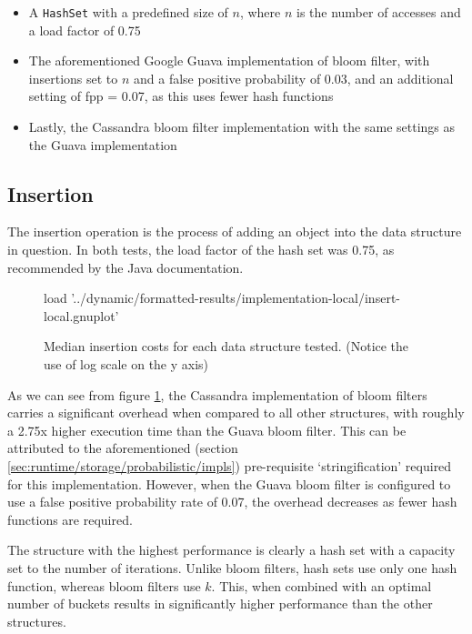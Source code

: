 \begin{itemize}
	\item A \texttt{HashSet} with a predefined size of $n$, where $n$ is the number of accesses and a load factor of 0.75
	\item The aforementioned Google Guava implementation of bloom filter, with insertions set to $n$ and a false positive probability of 0.03, and an additional setting of fpp = 0.07, as this uses fewer hash functions
	\item Lastly, the Cassandra bloom filter implementation with the same settings as the Guava implementation
\end{itemize}

	\subsection{Insertion} \label{sec:results/bfimpl/insert}
	The insertion operation is the process of adding an object into the data structure in question. In both tests, the load factor of the hash set was 0.75, as recommended by the Java documentation.
	
	\begin{figure}
		\centering
		\begin{gnuplot}[terminal=pdf]
			load '../dynamic/formatted-results/implementation-local/insert-local.gnuplot'
		\end{gnuplot}
		\caption{Median insertion costs for each data structure tested. (Notice the use of log scale on the y axis)}
		\label{chart:impl-insert}
	\end{figure}
	
	As we can see from figure \ref{chart:impl-insert}, the Cassandra implementation of bloom filters carries a significant overhead when compared to all other structures, with roughly a 2.75x higher execution time than the Guava bloom filter. This can be attributed to the aforementioned (section \ref{sec:runtime/storage/probabilistic/impls}) pre-requisite `stringification' required for this implementation. However, when the Guava bloom filter is configured to use a false positive probability rate of 0.07, the overhead decreases as fewer hash functions are required.
	
	The structure with the highest performance is clearly a hash set with a capacity set to the number of iterations. Unlike bloom filters, hash sets use only one hash function, whereas bloom filters use $k$. This, when combined with an optimal number of buckets results in significantly higher performance than the other structures.
	
